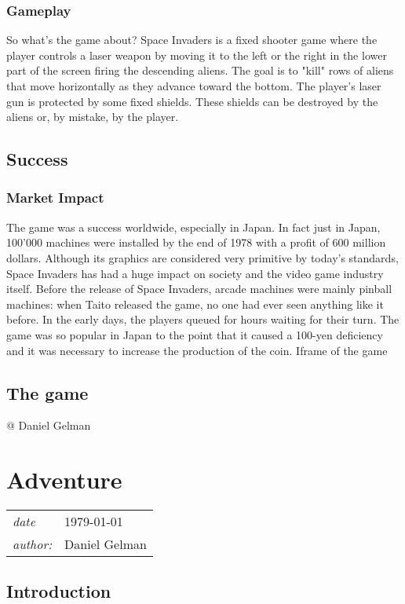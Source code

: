 \documentclass[a4paper,10pt]{book}
\newcommand{\pageHeader}[4]{
    \section{#1}
    \vspace{-0.3cm}
    \begin{table}[h!]
     \begin{tabular}{ll}
        \hline
        \textit{date} & #2 \\
        \textit{author: } & #3\\
        \hline
     \end{tabular}
    \end{table}
    \vspace{-0.3cm}
}
\begin{document}
 \subsubsection{Gameplay }
   \textbf{}   \textit{}
 
                So what's the game about?   Space Invaders is a fixed shooter game where the player controls a laser weapon by moving it to the left or the right in the lower part of the screen firing the descending aliens. The goal is to "kill" rows
                of aliens that move horizontally as they advance toward the bottom. The player's laser gun is protected by some fixed shields. These shields can be destroyed by the aliens or, by mistake, by the player.
             
 
 \subsection{Success }
 \subsubsection{Market Impact }
            The game was a success worldwide, especially in Japan.   In fact just in Japan, 100'000 machines were installed by the end of 1978 with a profit of 600 million dollars. Although its graphics are considered very primitive by today's standards,
            Space Invaders has had a huge impact on society and the video game industry itself. Before the release of Space Invaders, arcade machines were mainly pinball machines: when Taito released the game, no one had ever seen anything like it before.
            In the early days, the players queued for hours waiting for their turn. The game was so popular in Japan to the point that it caused a 100-yen deficiency and it was necessary to increase the production of the coin.
               \textbf{}   \textit{}
  Iframe of the game  
 
 \subsection{The game }
 
 
 
 
 @ Daniel Gelman 
 
 
 \newpage\pageHeader{Adventure}{1979-01-01}{Daniel Gelman}{Adventure is an arcade game created in 1979. Did you know that this is game is the inspiration behind the legend of Zelda? Me neither. But I will tell you more!}
 \subsection{Introduction }
\end{document}
